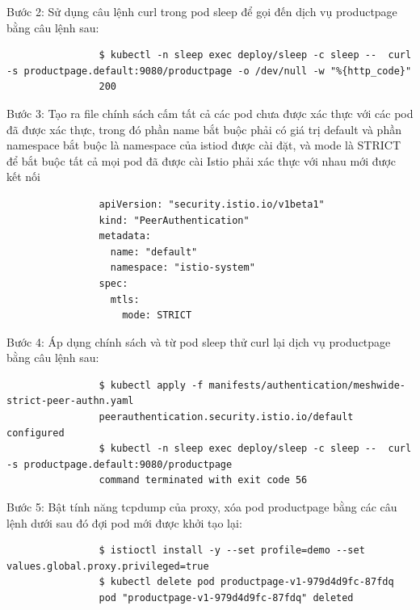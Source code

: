 \documentclass[14pt,a4paper]{book}
\begin{document}
{{				Bước 2: Sử dụng câu lệnh curl trong pod sleep để gọi đến dịch vụ productpage bằng câu lệnh sau:
				\begin{lstlisting}
				$ kubectl -n sleep exec deploy/sleep -c sleep --  curl -s productpage.default:9080/productpage -o /dev/null -w "%{http_code}"
				200
				\end{lstlisting}
				
				Bước 3: Tạo ra file chính sách cấm tất cả các pod chưa được xác thực với các pod đã được xác thực, trong đó phần name bắt buộc phải có giá trị default và phần namespace bắt buộc là namespace của istiod được cài đặt, và mode là STRICT để bắt buộc tất cả mọi pod đã được cài Istio phải xác thực với nhau mới được kết nối
				\begin{lstlisting}
				apiVersion: "security.istio.io/v1beta1"
				kind: "PeerAuthentication"
				metadata:
				  name: "default"
				  namespace: "istio-system"
				spec:
			 	  mtls:
				    mode: STRICT 
				\end{lstlisting}
				
				Bước 4: Áp dụng chính sách và từ pod sleep thử curl lại dịch vụ productpage bằng câu lệnh sau:
				\begin{lstlisting}
				$ kubectl apply -f manifests/authentication/meshwide-strict-peer-authn.yaml 
				peerauthentication.security.istio.io/default configured
				$ kubectl -n sleep exec deploy/sleep -c sleep --  curl -s productpage.default:9080/productpage
				command terminated with exit code 56
				\end{lstlisting}
				
				Bước 5: Bật tính năng tcpdump của proxy, xóa pod productpage  bằng các câu lệnh dưới sau đó đợi pod mới được khởi tạo lại:
				\begin{lstlisting}
				$ istioctl install -y --set profile=demo --set values.global.proxy.privileged=true
				$ kubectl delete pod productpage-v1-979d4d9fc-87fdq
				pod "productpage-v1-979d4d9fc-87fdq" deleted
				\end{lstlisting}
				
}}
\end{document}
